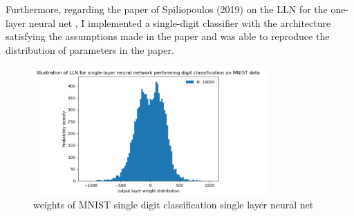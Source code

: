 \documentclass{article}
\begin{document}
Furthermore, regarding the paper of Spiliopoulos (2019) on the LLN for the one-layer neural net \cite{sirignano2019meanfieldanalysislln}, I implemented a single-digit classifier with the architecture satisfying the assumptions made in the paper and was able to reproduce the distribution of parameters in the paper.

\begin{figure}[H]
    \centering
    \includegraphics[width=0.8\textwidth]{images/Spiliopoulos2019-LLN-singleNN-mnist.png}
    \caption{weights of MNIST single digit classification single layer neural net}
    \label{fig: MNIST spiliopoulos}
\end{figure}
\end{document}
